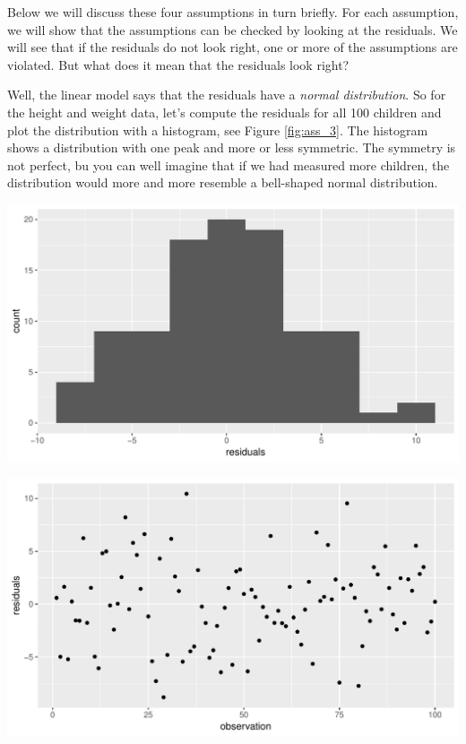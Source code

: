 \documentclass[]{report}\usepackage[]{graphicx}\usepackage[]{color}
\makeatletter
\def\maxwidth{ %
  \ifdim\Gin@nat@width>\linewidth
    \linewidth
  \else
    \Gin@nat@width
  \fi
}
\newenvironment{knitrout}{}{} %
\makeatother
\begin{document}
Below we will discuss these four assumptions in turn briefly. For each assumption, we will show that the assumptions can be checked by looking at the residuals. We will see that if the residuals do not look right, one or more of the assumptions are violated. But what does it mean that the residuals look right?

Well, the linear model says that the residuals have a \textit{normal distribution}. So for the height and weight data, let's compute the residuals for all 100 children and plot the distribution with a histogram, see Figure \ref{fig:ass_3}. The histogram shows a distribution with one peak and more or less symmetric. The symmetry is not perfect, bu you can well imagine that if we had measured more children, the distribution would more and more resemble a bell-shaped normal distribution. 

\begin{knitrout}
\color{fgcolor}

{\centering \includegraphics[width=\maxwidth]{figure/ass_3-1} 

}



\end{knitrout}

\begin{knitrout}
\color{fgcolor}

{\centering \includegraphics[width=\maxwidth]{figure/ass_4-1} 

}



\end{knitrout}
\end{document}
